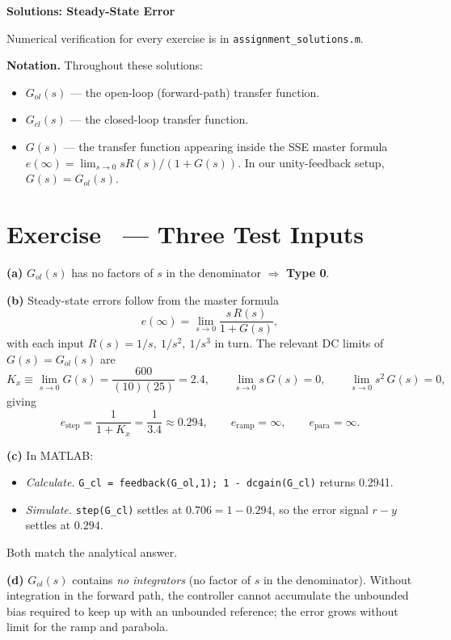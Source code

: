 \documentclass[11pt]{article}
\newcounter{exercise}
\newcommand{\exercise}[1]{%
  \refstepcounter{exercise}%
  \section*{Exercise \theexercise\ --- #1}%
}
\begin{document}
\begin{center}
  \Large{\bf{Solutions: Steady-State Error}}
\end{center}

Numerical verification for every exercise is in
\texttt{assignment\_solutions.m}.  

\textbf{Notation.}  Throughout these solutions:
\begin{itemize}
  \item $G_{ol}(s)$ --- the open-loop (forward-path) transfer function.
  \item $G_{cl}(s)$ --- the closed-loop transfer function.
  \item $G(s)$ --- the transfer function appearing inside the SSE master
    formula $e(\infty) = \lim_{s \to 0} sR(s)/(1 + G(s))$.  In our
    unity-feedback setup, $G(s) = G_{ol}(s)$.
\end{itemize}

\exercise{Three Test Inputs}

\textbf{(a)}  $G_{ol}(s)$ has no factors of $s$ in the denominator
$\Rightarrow$ \textbf{Type 0}.

\textbf{(b)}  Steady-state errors follow from the master formula
\[
  e(\infty) = \lim_{s \to 0} \frac{s\,R(s)}{1 + G(s)},
\]
with each input $R(s) = 1/s,\ 1/s^2,\ 1/s^3$ in turn.  The relevant DC
limits of $G(s) = G_{ol}(s)$ are
\[
  K_x \equiv \lim_{s \to 0} G(s) = \frac{600}{(10)(25)} = 2.4,
  \qquad
  \lim_{s \to 0} s\,G(s) = 0,
  \qquad
  \lim_{s \to 0} s^2\,G(s) = 0,
\]
giving
\[
  e_\mathrm{step} = \frac{1}{1 + K_x} = \frac{1}{3.4} \approx \boxed{0.294},
  \qquad
  e_\mathrm{ramp} = \boxed{\infty},
  \qquad
  e_\mathrm{para} = \boxed{\infty}.
\]

\textbf{(c)}  In MATLAB:
\begin{itemize}
  \item \emph{Calculate.}  \texttt{G\_cl = feedback(G\_ol,1); 1 - dcgain(G\_cl)}
    returns 0.2941.
  \item \emph{Simulate.}  \texttt{step(G\_cl)} settles at
    $0.706 = 1 - 0.294$, so the error signal $r - y$ settles at $0.294$.
\end{itemize}
Both match the analytical answer.

\textbf{(d)}  $G_{ol}(s)$ contains \emph{no integrators} (no factor of $s$
in the denominator).  Without integration in the forward path, the
controller cannot accumulate the unbounded bias required to keep up with
an unbounded reference; the error grows without limit for the ramp and
parabola.
\end{document}
